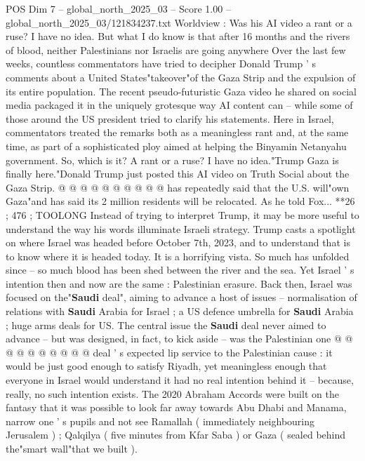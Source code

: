 \begin{textsample}{POS Dim 7 – global\_north\_2025\_03 – Score 1.00 – global\_north\_2025\_03/121834237.txt}  \label{ex:f7_pos_329}
Worldview : Was his AI video a rant or a ruse?
I have no idea.
But what I do know is that after 16 months and the rivers of blood, neither Palestinians nor Israelis are going anywhere Over the last few weeks, countless commentators have tried to decipher Donald Trump ' s comments about a United States"takeover"of the Gaza Strip and the expulsion of its entire population.
The recent pseudo-futuristic Gaza video he shared on social media packaged it in the uniquely grotesque way AI content can -- while some of those around the US president tried to clarify his statements.
Here in Israel, commentators treated the remarks both as a meaningless rant and, at the same time, as part of a sophisticated ploy aimed at helping the Binyamin Netanyahu government.
So, which is it?
A rant or a ruse?
I have no idea."Trump Gaza is finally here."Donald Trump just posted this AI video on Truth Social about the Gaza Strip. @ @ @ @ @ @ @ @ @ @ has repeatedly said that the U.S. will"own Gaza"and has said its 2 million residents will be relocated.
As he told Fox... **26 ; 476 ; TOOLONG Instead of trying to interpret Trump, it may be more useful to understand the way his words illuminate Israeli strategy.
Trump casts a spotlight on where Israel was headed before October 7th, 2023, and to understand that is to know where it is headed today.
It is a horrifying vista.
So much has unfolded since -- so much blood has been shed between the river and the sea.
Yet Israel ' s intention then and now are the same : Palestinian erasure.
Back then, Israel was focused on the"\textbf{Saudi} deal", aiming to advance a host of issues -- normalisation of relations with \textbf{Saudi} Arabia for Israel ; a US defence umbrella for \textbf{Saudi} Arabia ; huge arms deals for US.
The central issue the \textbf{Saudi} deal never aimed to advance -- but was designed, in fact, to kick aside -- was the Palestinian one @ @ @ @ @ @ @ @ @ @ deal ' s expected lip service to the Palestinian cause : it would be just good enough to satisfy Riyadh, yet meaningless enough that everyone in Israel would understand it had no real intention behind it -- because, really, no such intention exists.
The 2020 Abraham Accords were built on the fantasy that it was possible to look far away towards Abu Dhabi and Manama, narrow one ' s pupils and not see Ramallah ( immediately neighbouring Jerusalem ) ; Qalqilya ( five minutes from Kfar Saba ) or Gaza ( sealed behind the"smart wall"that we built ).

\end{textsample}
